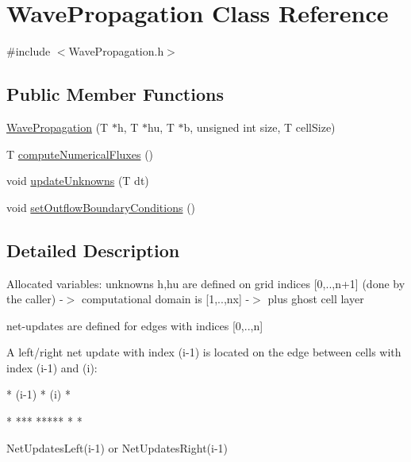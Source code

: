 \hypertarget{classWavePropagation}{\section{Wave\-Propagation Class Reference}
\label{classWavePropagation}
}


{\ttfamily \#include $<$Wave\-Propagation.\-h$>$}

\subsection*{Public Member Functions}
\begin{DoxyCompactItemize}
\item 
\hyperlink{classWavePropagation_a2c0caecf7e5ed5ed2dccdd0de09d6421}{Wave\-Propagation} (T $\ast$h, T $\ast$hu, T $\ast$b, unsigned int size, T cell\-Size)
\item 
T \hyperlink{classWavePropagation_a7e4ccdb5689e8e05c5e05887386d0a63}{compute\-Numerical\-Fluxes} ()
\item 
void \hyperlink{classWavePropagation_ae7b96a1eb21ae248a37afe4d57d01dd9}{update\-Unknowns} (T dt)
\item 
void \hyperlink{classWavePropagation_abdd5acb41399ec0cea238d41b8df1d6b}{set\-Outflow\-Boundary\-Conditions} ()
\end{DoxyCompactItemize}


\subsection{Detailed Description}
Allocated variables\-: unknowns h,hu are defined on grid indices \mbox{[}0,..,n+1\mbox{]} (done by the caller) -\/$>$ computational domain is \mbox{[}1,..,nx\mbox{]} -\/$>$ plus ghost cell layer

net-\/updates are defined for edges with indices \mbox{[}0,..,n\mbox{]}

A left/right net update with index (i-\/1) is located on the edge between cells with index (i-\/1) and (i)\-: 
\begin{DoxyPre}






  *  (i-1)  *   (i)   *






\begin{DoxyVerb}      *
     ***
    *****
      *
      *
\end{DoxyVerb}

   NetUpdatesLeft(i-1)
            or
   NetUpdatesRight(i-1)
\end{DoxyPre}
 

